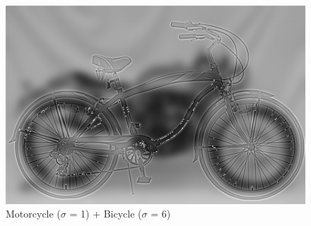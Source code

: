 \documentclass{article}
\begin{document}
\begin{minipage}{\linewidth}
     \begin{minipage}{0.45\linewidth}
        \begin{figure}[H]
            \includegraphics[width=\linewidth]{Ejercicio3/hybrid5.png}          
			\caption{Motorcycle ($\sigma$ = 1) + Bicycle ($\sigma$ = 6)}
        \end{figure}
    \end{minipage}
\end{minipage}
\end{document}

